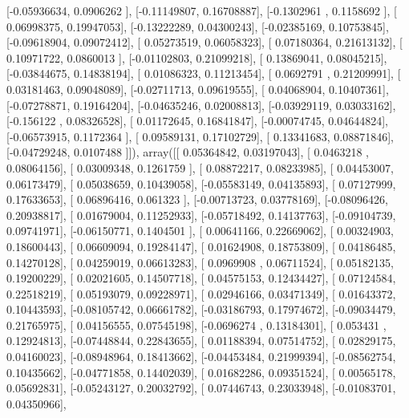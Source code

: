 \documentclass{article}
\begin{document}
       [-0.05936634,  0.0906262 ],
       [-0.11149807,  0.16708887],
       [-0.1302961 ,  0.1158692 ],
       [ 0.06998375,  0.19947053],
       [-0.13222289,  0.04300243],
       [-0.02385169,  0.10753845],
       [-0.09618904,  0.09072412],
       [ 0.05273519,  0.06058323],
       [ 0.07180364,  0.21613132],
       [ 0.10971722,  0.0860013 ],
       [-0.01102803,  0.21099218],
       [ 0.13869041,  0.08045215],
       [-0.03844675,  0.14838194],
       [ 0.01086323,  0.11213454],
       [ 0.0692791 ,  0.21209991],
       [ 0.03181463,  0.09048089],
       [-0.02711713,  0.09619555],
       [ 0.04068904,  0.10407361],
       [-0.07278871,  0.19164204],
       [-0.04635246,  0.02008813],
       [-0.03929119,  0.03033162],
       [-0.156122  ,  0.08326528],
       [ 0.01172645,  0.16841847],
       [-0.00074745,  0.04644824],
       [-0.06573915,  0.1172364 ],
       [ 0.09589131,  0.17102729],
       [ 0.13341683,  0.08871846],
       [-0.04729248,  0.0107488 ]]), array([[ 0.05364842,  0.03197043],
       [ 0.0463218 ,  0.08064156],
       [ 0.03009348,  0.1261759 ],
       [ 0.08872217,  0.08233985],
       [ 0.04453007,  0.06173479],
       [ 0.05038659,  0.10439058],
       [-0.05583149,  0.04135893],
       [ 0.07127999,  0.17633653],
       [ 0.06896416,  0.061323  ],
       [-0.00713723,  0.03778169],
       [-0.08096426,  0.20938817],
       [ 0.01679004,  0.11252933],
       [-0.05718492,  0.14137763],
       [-0.09104739,  0.09741971],
       [-0.06150771,  0.1404501 ],
       [ 0.00641166,  0.22669062],
       [ 0.00324903,  0.18600443],
       [ 0.06609094,  0.19284147],
       [ 0.01624908,  0.18753809],
       [ 0.04186485,  0.14270128],
       [ 0.04259019,  0.06613283],
       [ 0.0969908 ,  0.06711524],
       [ 0.05182135,  0.19200229],
       [ 0.02021605,  0.14507718],
       [ 0.04575153,  0.12434427],
       [ 0.07124584,  0.22518219],
       [ 0.05193079,  0.09228971],
       [ 0.02946166,  0.03471349],
       [ 0.01643372,  0.10443593],
       [-0.08105742,  0.06661782],
       [-0.03186793,  0.17974672],
       [-0.09034479,  0.21765975],
       [ 0.04156555,  0.07545198],
       [-0.0696274 ,  0.13184301],
       [ 0.053431  ,  0.12924813],
       [-0.07448844,  0.22843655],
       [ 0.01188394,  0.07514752],
       [ 0.02829175,  0.04160023],
       [-0.08948964,  0.18413662],
       [-0.04453484,  0.21999394],
       [-0.08562754,  0.10435662],
       [-0.04771858,  0.14402039],
       [ 0.01682286,  0.09351524],
       [ 0.00565178,  0.05692831],
       [-0.05243127,  0.20032792],
       [ 0.07446743,  0.23033948],
       [-0.01083701,  0.04350966],
\end{document}
